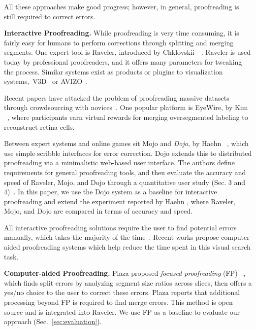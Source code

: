 All these approaches make good progress; however, in general, proofreading is still required to correct errors. 


\textbf{Interactive Proofreading.} While proofreading is very time consuming, it is fairly easy for humans to perform corrections through splitting and merging segments. One expert tool is Raveler, introduced by Chklovskii~\etal~\cite{chklovskii2010, raveler}. Raveler is used today by professional proofreaders, and it offers many parameters for tweaking the process. Similar systems exist as products or plugins to visualization systems,~\eg V3D~\cite{proofreading_bottleneck} or AVIZO~\cite{markus_proofreading}. 

Recent papers have attacked the problem of proofreading massive datasets through crowdsourcing with novices~\cite{saalfeld09,anderson2011,Giuly2013DP2}. One popular platform is EyeWire, by Kim \etal~\cite{eyewire_nature}, where participants earn virtual rewards for merging oversegmented labeling to reconstruct retina cells.

Between expert systems and online games sit Mojo and \textit{Dojo}, by Haehn \etal~\cite{haehn_dojo_2014,Neuroblocks}, which use simple scribble interfaces for error correction. Dojo extends this to distributed proofreading via a minimalistic web-based user interface. The authors define requirements for general proofreading tools, and then evaluate the accuracy and speed of Raveler, Mojo, and Dojo through a quantitative user study (Sec. 3 and 4)~\cite{haehn_dojo_2014}. In this paper, we use the Dojo system as a baseline for interactive proofreading and extend the experiment reported by Haehn \etal, where Raveler, Mojo, and Dojo are compared in terms of accuracy and speed.

All interactive proofreading solutions require the user to find potential errors manually, which takes the majority of the time~\cite{proofreading_bottleneck,haehn_dojo_2014}. Recent works propose computer-aided proofreading systems which help reduce the time spent in this visual search task.

\textbf{Computer-aided Proofreading.} Plaza proposed \textit{focused proofreading} (FP) ~\cite{focused_proofreading}, which finds split errors by analyzing segment size ratios across slices, then offers a yes/no choice to the user to correct these errors. Plaza reports that additional processing beyond FP is required to find merge errors. This method is open source and is integrated into Raveler. We use FP as a baseline to evaluate our approach (Sec.~\ref{sec:evaluation}).

